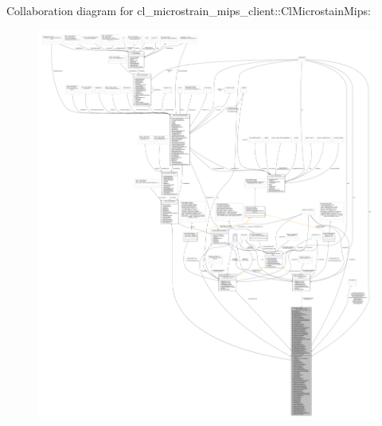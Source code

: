 Collaboration diagram for cl\+\_\+microstrain\+\_\+mips\+\_\+client\+:\+:Cl\+Microstain\+Mips\+:
\nopagebreak
\begin{figure}[H]
\begin{center}
\leavevmode
\includegraphics[width=350pt]{classcl__microstrain__mips__client_1_1ClMicrostainMips__coll__graph}
\end{center}
\end{figure}
